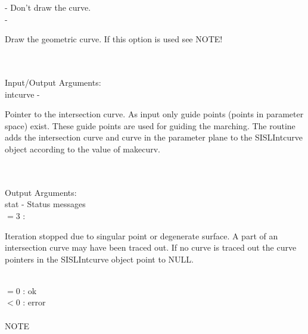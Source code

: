                 \>\>\>\> -     \>Don't draw the curve.\\
                \>\>\>\> -     \>\begin{minipg5}
                                        Draw the geometric curve. If this option
                                        is used see NOTE!
                                        \end{minipg5} \\[0.8ex]
\\
        \>Input/Output Arguments:\\
        \>\>    {\fov intcurve}\> - \>  \begin{minipg2}
                                Pointer to the intersection curve.
                                As input only
                                guide points (points in parameter space)
                                exist. These guide points
                                are used for guiding the marching.
                                The routine adds the
                                intersection curve and curve in the parameter
                                plane to the SISLIntcurve object according to the value
                                of makecurv.
                                \end{minipg2}\\[0.8ex]
\\
        \>Output Arguments:\\
        \>\>    {\fov stat}     \> - \> Status messages\\
                \>\>\>\>\>      $= 3$ : \>      \begin{minipg5}
                                                Iteration stopped due to singular
                                                point or degenerate surface. A part of
                                                an intersection curve may have been
                                                traced out. If no curve is traced out
                                                the curve pointers in the SISLIntcurve
                                                object point to NULL.
                                                \end{minipg5} \\[0.3ex]
                \>\>\>\>\>      $= 0$   :\> ok\\
                \>\>\>\>\>      $< 0$   :\> error\\
\\
NOTE\\
